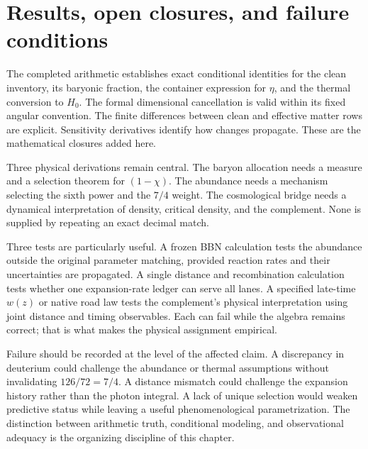 \section{Results, open closures, and failure conditions}
The completed arithmetic establishes exact conditional identities for the clean inventory, its baryonic fraction, the container expression for $\eta$, and the thermal conversion to $H_0$. The formal dimensional cancellation is valid within its fixed angular convention. The finite differences between clean and effective matter rows are explicit. Sensitivity derivatives identify how changes propagate. These are the mathematical closures added here.

Three physical derivations remain central. The baryon allocation needs a measure and a selection theorem for $(1-\chi)$. The abundance needs a mechanism selecting the sixth power and the $7/4$ weight. The cosmological bridge needs a dynamical interpretation of density, critical density, and the complement. None is supplied by repeating an exact decimal match.

Three tests are particularly useful. A frozen BBN calculation tests the abundance outside the original parameter matching, provided reaction rates and their uncertainties are propagated. A single distance and recombination calculation tests whether one expansion-rate ledger can serve all lanes. A specified late-time $w(z)$ or native road law tests the complement's physical interpretation using joint distance and timing observables. Each can fail while the algebra remains correct; that is what makes the physical assignment empirical.

Failure should be recorded at the level of the affected claim. A discrepancy in deuterium could challenge the abundance or thermal assumptions without invalidating $126/72=7/4$. A distance mismatch could challenge the expansion history rather than the photon integral. A lack of unique selection would weaken predictive status while leaving a useful phenomenological parametrization. The distinction between arithmetic truth, conditional modeling, and observational adequacy is the organizing discipline of this chapter.

